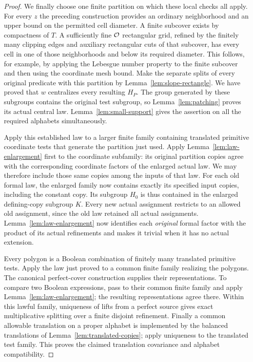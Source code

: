 \begin{proof}
We finally choose one finite partition on which these
local checks all apply.  For every $z$ the preceding
construction provides an ordinary neighborhood and an
upper bound on the permitted cell diameter.  A finite
subcover exists by compactness of $T$.  A sufficiently
fine $\mathcal O$ rectangular grid, refined by the finitely many
clipping edges and auxiliary rectangular cuts of that
subcover, has every cell in one of those neighborhoods
and below its required diameter.  This follows, for
example, by applying the Lebesgue number property to
the finite subcover and then using the coordinate mesh
bound.  Make the separate splits of every original
predicate with this partition by
Lemma~\ref{lem:slope-rectangle}.  We have proved that $w$
centralizes every resulting $H_P$.  The group generated by these
subgroups contains the original test subgroup, so
Lemma~\ref{lem:patching} proves its actual central law.
Lemma~\ref{lem:small-support} gives the assertion on all
the required alphabets simultaneously.

Apply this established law to a larger finite family containing
translated primitive coordinate tests that generate the partition just
used.  Apply Lemma~\ref{lem:law-enlargement} first to the coordinate
subfamily: its original partition copies agree with the corresponding
coordinate factors of the enlarged actual law.  We may therefore include
those same copies among the inputs of that law.  For each old formal law,
the enlarged family now contains exactly its specified input copies,
including the constant copy.  Its subgroup $H_0$ is thus contained in
the enlarged defining-copy subgroup $K$.
Every new actual assignment restricts to an allowed old assignment,
since the old law retained all actual assignments.
Lemma~\ref{lem:law-enlargement} now identifies each \emph{original}
formal factor with the product of its actual refinements and makes it
trivial when it has no actual extension.

Every polygon
is a Boolean combination of finitely many translated
primitive tests.  Apply the law just proved to a common
finite family realizing the polygons.  The canonical
perfect-cover construction supplies their representations.
To compare two Boolean expressions, pass to their common finite
family and apply Lemma~\ref{lem:law-enlargement}; the resulting
representations agree there.  Within this lawful family, uniqueness
of lifts from a perfect source gives exact
multiplicative splitting over a finite disjoint
refinement.  Finally a common allowable translation on
a proper alphabet is implemented by the balanced
translations of Lemma~\ref{lem:translated-copies}; apply
uniqueness to the translated test family.  This proves
the claimed translation covariance and alphabet
compatibility.
\end{proof}

